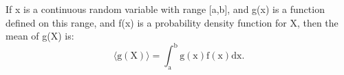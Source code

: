 If x is a continuous random variable with range [a,b], and g(x) is a function
defined on this range, and f(x) is a probability density function for X, then
the mean of g(X) is:
\[ \langle \mathrm{g(X)} \rangle = \int _ {\mathrm{a}} ^ {\mathrm{b}}
\mathrm{g(x)f(x)dx} . \]